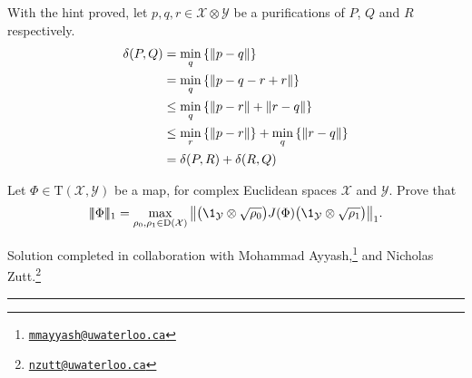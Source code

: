 \documentclass[boxes,pages,color=SeaGreen]{homework}
\newcommand{\collab}[1]{\footnote{\href{mailto:#1}{\texttt{#1}}}}
\newcommand{\X}{\mathcal{X}}
\newcommand{\Y}{\mathcal{Y}}
\newcommand{\Trans}{\mathrm{T}}
\newcommand{\Density}{\mathrm{D}}
\newcommand{\triplenorm}[1]{
  \lvert\!\lvert\!\lvert #1 
  \rvert\!\rvert\!\rvert}
\begin{document}
\begin{solution}
    With the hint proved, let $p, q, r\in\X\otimes\Y$ be a purifications of $P$, $Q$ and $R$ respectively.
    \begin{align*}
        \delta(P, Q) & = \min_{q}\qty{\norm{p - q}}                                 \\
                     & = \min_{q}\qty{\norm{p - q - r + r}}                         \\
                     & \leq \min_{q}\qty{\norm{p - r} + \norm{r - q}}               \\
                     & \leq \min_{r}\qty{\norm{p - r}} + \min_{q}\qty{\norm{r - q}} \\
                     & = \delta(P, R) + \delta(R, Q)
    \end{align*}

\end{solution}


\begin{problem}
Let $\Phi\in\Trans(\X,\Y)$ be a map, for complex Euclidean spaces $\X$ and
$\Y$.
Prove that
\[
    \triplenorm{\Phi}_1 =
    \max_{\rho_0,\rho_1\in\Density(\X)}
    \norm{
        \qty\big( \1_{\Y} \otimes \sqrt{\rho_0} ) J(\Phi)
        \qty\big( \1_{\Y} \otimes \sqrt{\rho_1} )
    }_1.
\]
\end{problem}

\noindent Solution completed in collaboration with Mohammad Ayyash,\collab{mmayyash@uwaterloo.ca} and Nicholas Zutt.\collab{nzutt@uwaterloo.ca}

{\noindent\color{SeaGreen!30}\rule{\textwidth}{1.5pt}}
\end{document}
